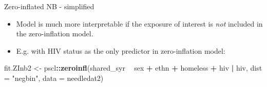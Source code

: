 \documentclass[
  ignorenonframetext,
]{beamer}
\newenvironment{Shaded}{\begin{snugshade}}{\end{snugshade}}
\newcommand{\DataTypeTok}[1]{\textcolor[rgb]{0.13,0.29,0.53}{#1}}
\newcommand{\KeywordTok}[1]{\textcolor[rgb]{0.13,0.29,0.53}{\textbf{#1}}}
\newcommand{\NormalTok}[1]{#1}
\newcommand{\OperatorTok}[1]{\textcolor[rgb]{0.81,0.36,0.00}{\textbf{#1}}}
\newcommand{\StringTok}[1]{\textcolor[rgb]{0.31,0.60,0.02}{#1}}
\providecommand{\tightlist}{%
  \setlength{\itemsep}{0pt}\setlength{\parskip}{0pt}}
\begin{document}
\begin{frame}[fragile]{Zero-inflated NB - simplified}
\protect\hypertarget{zero-inflated-nb---simplified}{}

\begin{itemize}
\tightlist
\item
  Model is much more interpretable if the exposure of interest is
  \emph{not} included in the zero-inflation model.
\item
  E.g. with HIV status as the only predictor in zero-inflation model:
\end{itemize}

\begin{Shaded}
\begin{Highlighting}[]
\NormalTok{fit.ZInb2 <-}\StringTok{ }\NormalTok{pscl}\OperatorTok{::}\KeywordTok{zeroinfl}\NormalTok{(shared_syr }\OperatorTok{~}\StringTok{ }\NormalTok{sex }\OperatorTok{+}\StringTok{ }\NormalTok{ethn }\OperatorTok{+}\StringTok{ }
\StringTok{                        }\NormalTok{homeless }\OperatorTok{+}\StringTok{ }\NormalTok{hiv }\OperatorTok{|}\StringTok{ }\NormalTok{hiv,}
                      \DataTypeTok{dist =} \StringTok{"negbin"}\NormalTok{,}
                      \DataTypeTok{data =}\NormalTok{ needledat2)}
\end{Highlighting}
\end{Shaded}

\end{frame}
\end{document}
